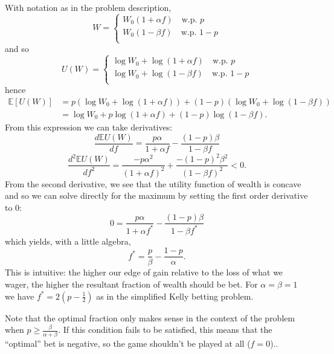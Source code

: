 \documentclass{article}
\begin{document}
With notation as in the problem description,
\begin{equation*}
    W = \left\{
        \begin{array}{ll}
            W_0(1 + \alpha f) \quad \text{w.p. } p\\
            W_0(1 - \beta f) \quad \text{w.p. } 1-p\\
        \end{array}
        \right.
\end{equation*}
and so
\begin{equation*}
    U(W) = \left\{
        \begin{array}{ll}
            \log W_0 + \log(1 + \alpha f) \quad \text{w.p. } p\\
            \log W_0 + \log(1 - \beta f) \quad \text{w.p. } 1-p\\
        \end{array}
        \right.
\end{equation*}
hence
\begin{align}
    \mathbb{E}[U(W)] &= p(\log W_0 + \log(1+\alpha f)) + (1-p)(\log W_0 + \log(1-\beta f))\\
    &= \log W_0 + p\log(1+\alpha f) + (1-p)\log(1-\beta f).
\end{align}
From this expression we can take derivatives:
\begin{equation}
    \frac{d\mathbb{E}U(W)}{df} = \frac{p\alpha}{1+\alpha f} - \frac{(1-p)\beta}{1-\beta f} 
\end{equation}
\begin{equation}
    \frac{d^2 \mathbb{E}U(W)}{df^2} = \frac{-p\alpha^2}{(1+\alpha f)^2} + \frac{-(1-p)^2\beta^2}{(1-\beta f)^2} < 0.
\end{equation}
From the second derivative, we see that the utility function of wealth is concave and so we can solve directly for the maximum by setting the first order derivative to 0:
\begin{equation}
    0 = \frac{p\alpha}{1+\alpha f^*} - \frac{(1-p)\beta}{1-\beta f^*} 
\end{equation}
which yields, with a little algebra,
\begin{equation}
    f^* = \frac{p}{\beta} - \frac{1-p}{\alpha}.
\end{equation}
This is intuitive: the higher our edge of gain relative to the loss of what we wager, the higher the resultant fraction of wealth should be bet. For $\alpha = \beta = 1$ we have $f^* = 2\left(p-\frac{1}{2}\right)$ as in the simplified Kelly betting problem.

Note that the optimal fraction only makes sense in the context of the problem when $p \geq \frac{\beta}{\alpha+\beta}$. If this condition fails to be satisfied, this means that the ``optimal'' bet is negative, so the game shouldn't be played at all ($f = 0$)..
\end{document}
